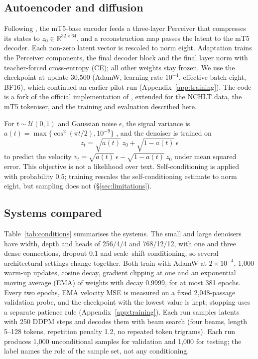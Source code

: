 \documentclass[11pt,a4paper]{article}
\begin{document}
\subsection{Autoencoder and diffusion}
Following \citet{lovelace2023latent}, the mT5-base encoder \citep{xue2021mt5} feeds a three-layer Perceiver \citep{jaegle2021perceiver} that compresses its states to $z_0 \in \mathbb{R}^{32\times 64}$, and a reconstruction map passes the latent to the mT5 decoder. Each non-zero latent vector is rescaled to norm eight. Adaptation trains the Perceiver components, the final decoder block and the final layer norm with teacher-forced cross-entropy (CE); all other weights stay frozen. We use the checkpoint at update 30,500 (AdamW, learning rate $10^{-4}$, effective batch eight, BF16), which continued an earlier pilot run (Appendix~\ref{app:training}). The code is a fork of the official implementation of \citet{lovelace2023latent}, extended for the NCHLT data, the mT5 tokeniser, and the training and evaluation described here.

For $t \sim \mathcal{U}(0,1)$ and Gaussian noise $\epsilon$, the signal variance is $a(t) = \max\{\cos^2(\pi t/2), 10^{-9}\}$ \citep{nichol2021improved}, and the denoiser is trained on
\begin{equation}
z_t = \sqrt{a(t)}\,z_0 + \sqrt{1-a(t)}\,\epsilon
\end{equation}
to predict the velocity $v_t = \sqrt{a(t)}\,\epsilon - \sqrt{1-a(t)}\,z_0$ \citep{salimans2022progressive} under mean squared error. This objective is not a likelihood over text. Self-conditioning \citep{chen2023analog} is applied with probability 0.5; training rescales the self-conditioning estimate to norm eight, but sampling does not (\S\ref{sec:limitations}).

\subsection{Systems compared}
Table~\ref{tab:conditions} summarises the systems. The small and large denoisers have width, depth and heads of 256/4/4 and 768/12/12, with one and three dense connections, dropout 0.1 and scale--shift conditioning, so several architectural settings change together. Both train with AdamW at $2\times10^{-4}$, 1,000 warm-up updates, cosine decay, gradient clipping at one and an exponential moving average (EMA) of weights with decay 0.9999, for at most 381 epochs. Every two epochs, EMA velocity MSE is measured on a fixed 2,048-passage validation probe, and the checkpoint with the lowest value is kept; stopping uses a separate patience rule (Appendix~\ref{app:training}). Each run samples latents with 250 DDPM steps \citep{ho2020denoising} and decodes them with beam search (four beams, length 5--128 tokens, repetition penalty 1.2, no repeated token trigrams). Each run produces 1,000 unconditional samples for validation and 1,000 for testing; the label names the role of the sample set, not any conditioning.
\end{document}
